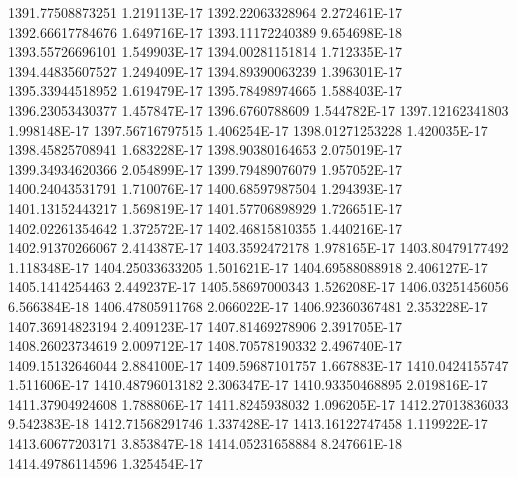 1391.77508873251  1.219113E-17
1392.22063328964  2.272461E-17
1392.66617784676  1.649716E-17
1393.11172240389  9.654698E-18
1393.55726696101  1.549903E-17
1394.00281151814  1.712335E-17
1394.44835607527  1.249409E-17
1394.89390063239  1.396301E-17
1395.33944518952  1.619479E-17
1395.78498974665  1.588403E-17
1396.23053430377  1.457847E-17
1396.6760788609  1.544782E-17
1397.12162341803  1.998148E-17
1397.56716797515  1.406254E-17
1398.01271253228  1.420035E-17
1398.45825708941  1.683228E-17
1398.90380164653  2.075019E-17
1399.34934620366  2.054899E-17
1399.79489076079  1.957052E-17
1400.24043531791  1.710076E-17
1400.68597987504  1.294393E-17
1401.13152443217  1.569819E-17
1401.57706898929  1.726651E-17
1402.02261354642  1.372572E-17
1402.46815810355  1.440216E-17
1402.91370266067  2.414387E-17
1403.3592472178  1.978165E-17
1403.80479177492  1.118348E-17
1404.25033633205  1.501621E-17
1404.69588088918  2.406127E-17
1405.1414254463  2.449237E-17
1405.58697000343  1.526208E-17
1406.03251456056  6.566384E-18
1406.47805911768  2.066022E-17
1406.92360367481  2.353228E-17
1407.36914823194  2.409123E-17
1407.81469278906  2.391705E-17
1408.26023734619  2.009712E-17
1408.70578190332  2.496740E-17
1409.15132646044  2.884100E-17
1409.59687101757  1.667883E-17
1410.0424155747  1.511606E-17
1410.48796013182  2.306347E-17
1410.93350468895  2.019816E-17
1411.37904924608  1.788806E-17
1411.8245938032  1.096205E-17
1412.27013836033  9.542383E-18
1412.71568291746  1.337428E-17
1413.16122747458  1.119922E-17
1413.60677203171  3.853847E-18
1414.05231658884  8.247661E-18
1414.49786114596  1.325454E-17
